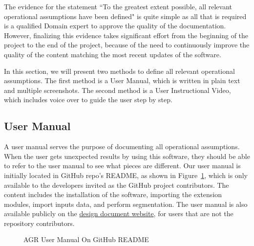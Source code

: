 The evidence for the statement ``To the greatest extent possible, all relevant operational assumptions have been defined" is quite simple as all that is required is a qualified Domain expert to approve the quality of the documentation. However, finalizing this evidence takes significant effort from the beginning of the project to the end of the project, because of the need to continuously improve the quality of the content matching the most recent updates of the software.

In this section, we will present two methods to define all relevant operational assumptions. The first method is a User Manual, which is written in plain text and multiple screenshots. The second method is a User Instructional Video, which includes voice over to guide the user step by step.

\subsection{User Manual}
A user manual serves the purpose of documenting all operational assumptions. When the user gets unexpected results by using this software, they should be able to refer to the user manual to see what pieces are different. Our user manual is initially located in GitHub repo's README, as shown in Figure~\ref{fig_agr_git_um}, which is only available to the developers invited as the GitHub project contributors. The content includes the installation of the software, importing the extension modules, import inputs data, and perform segmentation. The user manual is also available publicly on the \href{https://joviel25.github.io/AortaGR-design-document/UserInstructions.html}{design document website}, for users that are not the repository contributors.

\begin{figure}[H]
    \centering
    \caption[AGR User Manual On GitHub README]{AGR User Manual On GitHub README}
    \label{fig_agr_git_um}
\end{figure}


